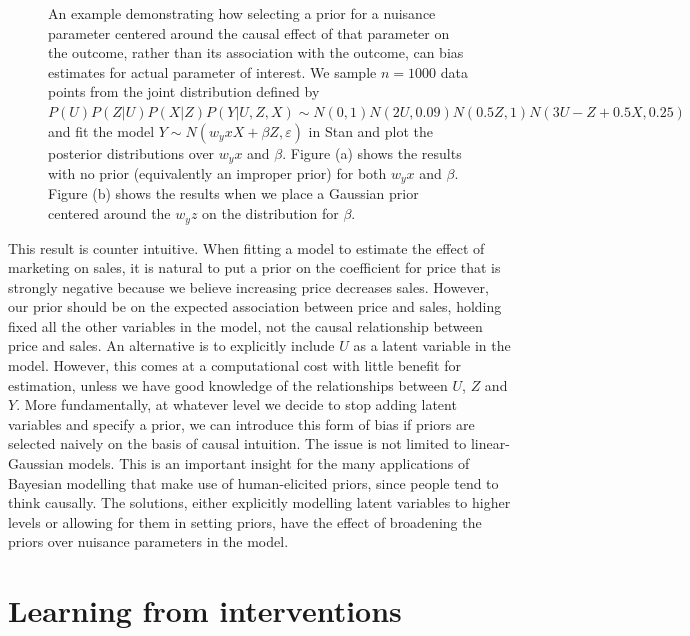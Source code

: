 \documentclass[11pt,a4paper,twoside]{report}
\theoremstyle{plain}
\theoremstyle{definition}
\let\epsilon\varepsilon
\begin{document}
\begin{figure}[ht]
\begin{subfigure}[t]{0.99\textwidth}
\end{subfigure}
\caption{An example demonstrating how selecting a prior for a nuisance parameter centered around the causal effect of that parameter on the outcome, rather than its association with the outcome, can bias estimates for actual parameter of interest. We sample $n=1000$ data points from the joint distribution defined by $P(U)P(Z|U)P(X|Z)P(Y|U,Z,X) \sim N(0,1)N(2U,0.09)N(0.5Z,1)N(3U -Z + 0.5X , 0.25)$ and fit the model $Y \sim N(w_yx X+\beta Z,\epsilon)$ in Stan and plot the posterior distributions over $w_yx$ and $\beta$. Figure (a) shows the results with no prior (equivalently an improper prior) for both $w_yx$ and $\beta$. Figure (b) shows the results when we place a Gaussian prior centered around the $w_yz$ on the distribution for $\beta$.}\label{fig:careful-prior-example}
\end{figure}

This result is counter intuitive. When fitting a model to estimate the effect of marketing on sales, it is natural to put a prior on the coefficient for price that is strongly negative because we believe increasing price decreases sales. However, our prior should be on the expected association between price and sales, holding fixed all the other variables in the model, not the causal relationship between price and sales. An alternative is to explicitly include $U$ as a latent variable in the model. However, this comes at a computational cost with little benefit for estimation, unless we have good knowledge of the relationships between $U$, $Z$ and $Y$. More fundamentally, at whatever level we decide to stop adding latent variables and specify a prior, we can introduce this form of bias if priors are selected naively on the basis of causal intuition. The issue is not limited to linear-Gaussian models. This is an important insight for the many applications of Bayesian modelling that make use of human-elicited priors, since people tend to think causally. The solutions, either explicitly modelling latent variables to higher levels or allowing for them in setting priors, have the effect of broadening the priors over nuisance parameters in the model. 


\chapter{Learning from interventions}
\label{chap:interventionalist_view}
\end{document}
